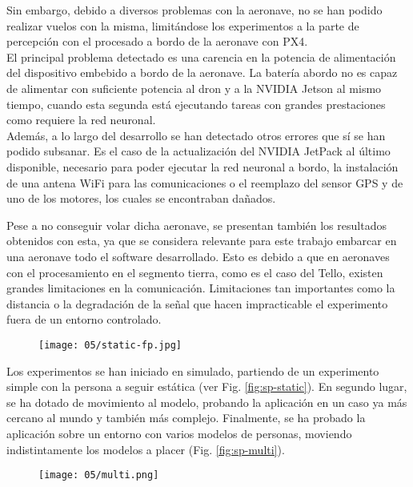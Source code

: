 \documentclass[../main.tex]{subfiles}
\begin{document}
Sin embargo, debido a diversos problemas con la aeronave, no se han podido realizar vuelos con la misma, limitándose los experimentos a la parte de percepción con el procesado a bordo de la aeronave con PX4. \\
El principal problema detectado es una carencia en la potencia de alimentación del dispositivo embebido a bordo de la aeronave. La batería abordo no es capaz de alimentar con suficiente potencia al dron y a la NVIDIA Jetson al mismo tiempo, cuando esta segunda está ejecutando tareas con grandes prestaciones como requiere la red neuronal. \\
Además, a lo largo del desarrollo se han detectado otros errores que sí se han podido subsanar. Es el caso de la actualización del NVIDIA JetPack al último disponible, necesario para poder ejecutar la red neuronal a bordo, la instalación de una antena WiFi para las comunicaciones o el reemplazo del sensor GPS y de uno de los motores, los cuales se encontraban dañados.

Pese a no conseguir volar dicha aeronave, se presentan también los resultados obtenidos con esta, ya que se considera relevante para este trabajo embarcar en una aeronave todo el software desarrollado. Esto es debido a que en aeronaves con el procesamiento en el segmento tierra, como es el caso del Tello, existen grandes limitaciones en la comunicación. Limitaciones tan importantes como la distancia o la degradación de la señal que hacen impracticable el experimento fuera de un entorno controlado.
% 

\begin{figure}[!ht]
 	{\texttt{[image: 05/static-fp.jpg]}}
\end{figure}

Los experimentos se han iniciado en simulado, partiendo de un experimento simple con la persona a seguir estática (ver Fig. \ref{fig:sp-static}). En segundo lugar, se ha dotado de movimiento al modelo, probando la aplicación en un caso ya más cercano al mundo y también más complejo. Finalmente, se ha probado la aplicación sobre un entorno con varios modelos de personas, moviendo indistintamente los modelos a placer (Fig. \ref{fig:sp-multi}).

\begin{figure}[!ht]
 	{\texttt{[image: 05/multi.png]}}
\end{figure}
\end{document}
